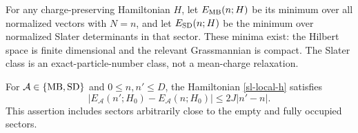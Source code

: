 For any charge-preserving Hamiltonian \(H\), let
\(E_{\rm MB}(n;H)\) be its minimum over all normalized vectors with
\(N=n\), and let \(E_{\rm SD}(n;H)\) be the minimum over normalized
Slater determinants in that sector. These minima exist: the Hilbert
space is finite dimensional and the relevant Grassmannian is compact.
The Slater class is an exact-particle-number class, not a mean-charge
relaxation.

\begin{lemma}
\label{sl-charge-lip}
For \(\mathcal A\in\{{\rm MB},{\rm SD}\}\) and
\(0\le n,n'\le D\), the Hamiltonian \eqref{sl-local-h} satisfies
\begin{equation}
\left|E_{\mathcal A}(n';H_0)-E_{\mathcal A}(n;H_0)\right|
\le 2J|n'-n|.
\label{sl-charge-lip-eq}
\end{equation}
This assertion includes sectors arbitrarily close to the empty and fully
occupied sectors.
\end{lemma}

